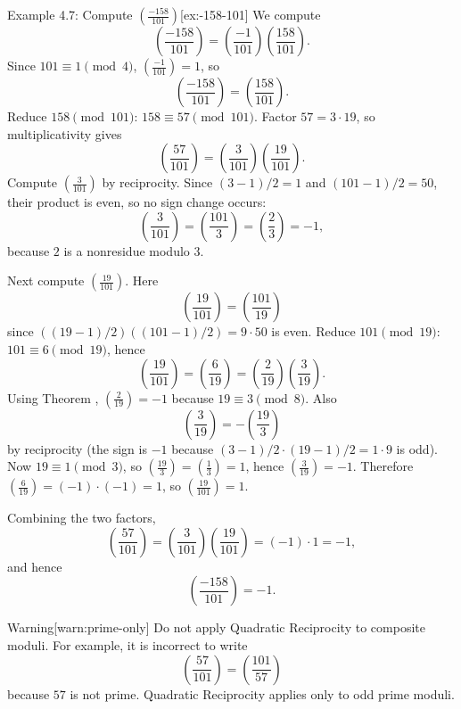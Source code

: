 \documentclass[10pt]{article}
\theoremstyle{definition}
\theoremstyle{plain}
\numberwithin{equation}{section}
\begin{document}
\begin{define}{Example 4.7: Compute $\left(\frac{-158}{101}\right)$}[ex:-158-101]
We compute
\[
\left(\frac{-158}{101}\right)=\left(\frac{-1}{101}\right)\left(\frac{158}{101}\right).
\]
Since $101\equiv 1\pmod 4$, $\left(\frac{-1}{101}\right)=1$, so
\[
\left(\frac{-158}{101}\right)=\left(\frac{158}{101}\right).
\]
Reduce $158\pmod{101}$: $158\equiv 57\pmod{101}$. Factor $57=3\cdot 19$, so multiplicativity gives
\[
\left(\frac{57}{101}\right)=\left(\frac{3}{101}\right)\left(\frac{19}{101}\right).
\]
Compute $\left(\frac{3}{101}\right)$ by reciprocity. Since $(3-1)/2=1$ and $(101-1)/2=50$, their product is even,
so no sign change occurs:
\[
\left(\frac{3}{101}\right)=\left(\frac{101}{3}\right)=\left(\frac{2}{3}\right)=-1,
\]
because $2$ is a nonresidue modulo $3$.

Next compute $\left(\frac{19}{101}\right)$. Here
\[
\left(\frac{19}{101}\right)=\left(\frac{101}{19}\right)
\]
since $((19-1)/2)((101-1)/2)=9\cdot50$ is even. Reduce $101\pmod{19}$: $101\equiv 6\pmod{19}$, hence
\[
\left(\frac{19}{101}\right)=\left(\frac{6}{19}\right)=\left(\frac{2}{19}\right)\left(\frac{3}{19}\right).
\]
Using Theorem , $\left(\frac{2}{19}\right)=-1$ because $19\equiv 3\pmod 8$.
Also
\[
\left(\frac{3}{19}\right) = -\left(\frac{19}{3}\right)
\]
by reciprocity (the sign is $-1$ because $(3-1)/2\cdot(19-1)/2 =1\cdot9$ is odd). Now $19\equiv 1\pmod 3$, so
$\left(\frac{19}{3}\right)=\left(\frac{1}{3}\right)=1$, hence $\left(\frac{3}{19}\right)=-1$.
Therefore $\left(\frac{6}{19}\right)=(-1)\cdot(-1)=1$, so $\left(\frac{19}{101}\right)=1$.

Combining the two factors,
\[
\left(\frac{57}{101}\right)=\left(\frac{3}{101}\right)\left(\frac{19}{101}\right)=(-1)\cdot 1 = -1,
\]
and hence
\[
\left(\frac{-158}{101}\right)=-1.
\]
\end{define}

\bigskip

\begin{define}{Warning}[warn:prime-only]
Do not apply Quadratic Reciprocity to composite moduli. For example, it is incorrect to write
\[
\left(\frac{57}{101}\right)=\left(\frac{101}{57}\right)
\]
because $57$ is not prime. Quadratic Reciprocity applies only to odd prime moduli.
\end{define}

\end{document}

